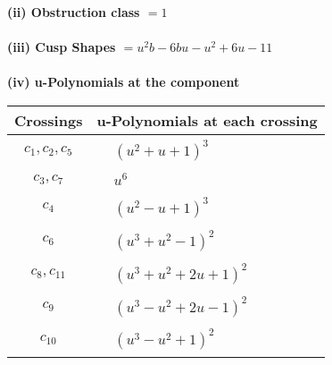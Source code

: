 \documentclass[1p]{elsarticle_modified}
\theoremstyle{definition}
\begin{document}
\flushleft \textbf{(ii) Obstruction class $= 1$}\\~\\
\flushleft \textbf{(iii) Cusp Shapes $= u^2 b-6 b u- u^2+6 u-11$}\\~\\
\newpage\renewcommand{\arraystretch}{1}
\flushleft \textbf{(iv) u-Polynomials at the component}\newline \\
\begin{tabular}{m{50pt}|m{274pt}}
Crossings & \hspace{64pt}u-Polynomials at each crossing \\
\hline $$\begin{aligned}c_{1},c_{2},c_{5}\end{aligned}$$&$\begin{aligned}
&(u^2+u+1)^3
\end{aligned}$\\
\hline $$\begin{aligned}c_{3},c_{7}\end{aligned}$$&$\begin{aligned}
&u^6
\end{aligned}$\\
\hline $$\begin{aligned}c_{4}\end{aligned}$$&$\begin{aligned}
&(u^2- u+1)^3
\end{aligned}$\\
\hline $$\begin{aligned}c_{6}\end{aligned}$$&$\begin{aligned}
&(u^3+u^2-1)^2
\end{aligned}$\\
\hline $$\begin{aligned}c_{8},c_{11}\end{aligned}$$&$\begin{aligned}
&(u^3+u^2+2 u+1)^2
\end{aligned}$\\
\hline $$\begin{aligned}c_{9}\end{aligned}$$&$\begin{aligned}
&(u^3- u^2+2 u-1)^2
\end{aligned}$\\
\hline $$\begin{aligned}c_{10}\end{aligned}$$&$\begin{aligned}
&(u^3- u^2+1)^2
\end{aligned}$\\
\hline
\end{tabular}\\~\\
\end{document}
